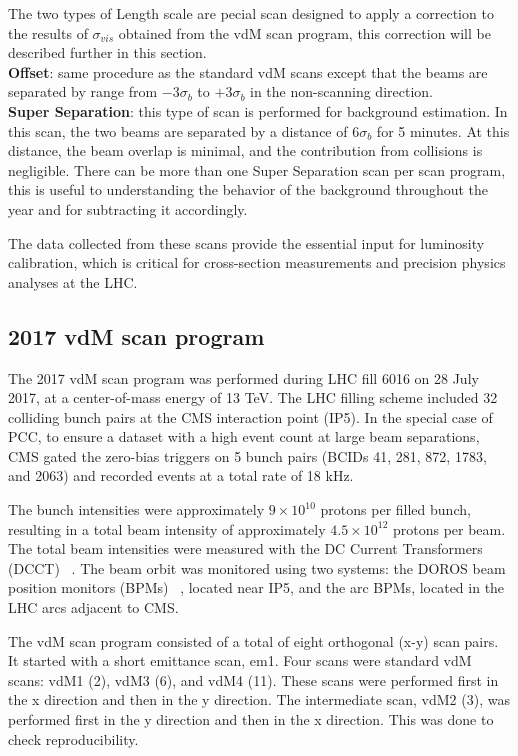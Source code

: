 The two types of Length scale are pecial scan designed to apply a correction to the results of  $\sigma_{vis}$ obtained from the vdM scan program, this correction will be described further in this section.\\
 
\noindent \textbf{Offset}: same procedure as the standard vdM scans except that the beams are separated by  range from $-3\sigma_{b}$ to $+3\sigma_{b}$ in the non-scanning direction.\\ 
 
\noindent \textbf{Super Separation}: this type of scan is performed for background estimation. In this scan, the two beams are separated by a distance of \(6\sigma_{b}\) for 5 minutes. At this distance, the beam overlap is minimal, and the contribution from collisions is negligible.  
There can be more than one Super Separation scan per scan program, this is useful to understanding the behavior of the background throughout the year and for subtracting it accordingly.

The data collected from these scans provide the essential input for luminosity calibration, which is critical for cross-section measurements and precision physics analyses at the LHC.
 
\subsection{2017 vdM scan program}
\label{2017 vdM scan program}

The 2017 vdM scan program was performed during LHC fill 6016 on 28 July 2017, at a center-of-mass energy of 13 TeV. The LHC filling scheme included 32 colliding bunch pairs at the CMS interaction point (IP5). In the special case of PCC, to ensure a dataset with a high event count at large beam separations, CMS gated the zero-bias triggers on 5 bunch pairs (BCIDs 41, 281, 872, 1783, and 2063) and recorded events at a total rate of 18 kHz.  

The bunch intensities were approximately \(9 \times 10^{10}\) protons per filled bunch, resulting in a total beam intensity of approximately \(4.5 \times 10^{12}\) protons per beam. The total beam intensities were measured with the DC Current Transformers (DCCT) ~\citep{LHC_DCCT_calibration}.  The beam orbit was monitored using two systems: the DOROS beam position monitors (BPMs) ~\citep{BPM__electronics}, located near IP5, and the arc BPMs, located in the LHC arcs adjacent to CMS.  

The vdM scan program consisted of a total of eight orthogonal (x-y) scan pairs. It started with a short emittance scan, em1. Four scans were standard vdM scans: vdM1 (2), vdM3 (6), and vdM4 (11). These scans were performed first in the x direction and then in the y direction. The intermediate scan, vdM2 (3), was performed first in the y direction and then in the x direction. This was done to check reproducibility.  


